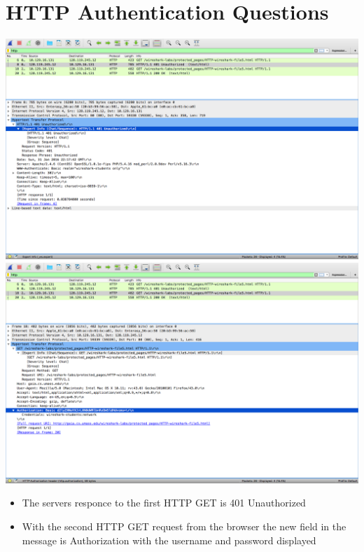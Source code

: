 \documentclass{article}
\begin{document}
\section {HTTP Authentication Questions}
\includegraphics[width=\textwidth]{HTTPAuthenticationReply}\\
\includegraphics[width=\textwidth]{HTTPAuthenticationGet}\\
\begin{itemize}
  \item The servers responce to the first HTTP GET is 401 Unauthorized
  \item With the second HTTP GET request from the browser the new field in the message is Authorization with the username and password displayed
\end{itemize}
\end{document}

